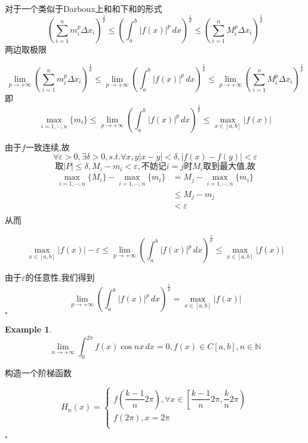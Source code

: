 \documentclass[11pt,hyperref,a4paper,UTF8]{ctexart}
\newtheorem{example}{Example}[subsection]
\newenvironment{cproof}{%
\heiti{证明}\kaishu
}{%
  \hfill $\square$
  \par\bigskip
}
\newcommand{\NN}{\mathbb{N}}
\newcommand{\parameter}[1]{\left(#1\right)}
\newcommand{\abs}[1]{\left|#1\right|}
\begin{document}
\begin{CJK}{UTF8}{gkai}
\begin{cproof}
  对于一个类似于Darboux上和和下和的形式
  \[\parameter{\sum_{i = 1}^{n} m_i^p \Delta x_i}^{\frac{1}{p}} \leq  \parameter{\int_{a}^{b} |f(x)|^p \, dx}^{\frac{1}{p}} \leq  \parameter{\sum_{i = 1}^{n} M_i^p \Delta x_i}^{\frac{1}{p}}\]
两边取极限

\[\lim_{p \to +\infty} \parameter{\sum_{i = 1}^{n} m_i^p \Delta x_i}^{\frac{1}{p}} \leq \lim_{p \to + \infty} \parameter{\int_{a}^{b} |f(x)|^p \, dx}^{\frac{1}{p}} \leq \lim_{p \to +\infty} \parameter{\sum_{i = 1}^{n} M_i^p \Delta x_i}^{\frac{1}{p}}\]
即
\[\max_{i = 1,\cdots ,n}\{m_i\} \leq \lim_{p \to + \infty} (\int_{a}^{b} |f(x)|^p \, dx)^{\frac{1}{p}} \leq \max_{x\in[a,b]}\abs{f(x)}\]

由于$f$一致连续,故
\[\forall \varepsilon> 0 ,\exists \delta >0, s.t.\forall x,y |x - y| < \delta , |f(x) - f(y)| < \varepsilon \]
\[\text{取}|P| \leq \delta ,M_i - m_i < \varepsilon ,\text{不妨记}i = j\text{时}M_i\text{取到最大值,故}\]
\[
\begin{aligned}\max_{i = 1,\cdots ,n}\{M_i\} - \max_{i = 1,\cdots ,n}\{m_i\} &= M_j - \max_{i = 1,\cdots ,n}\{m_i\}\\
  &\leq M_j - m_j\\
  &< \varepsilon\\
\end{aligned}  
\]
从而

\[\max_{x\in[a,b]}\abs{f(x)} - \varepsilon \leq \lim_{p \to + \infty} \parameter{\int_{a}^{b} |f(x)|^p \, dx}^{\frac{1}{p}} \leq \max_{x\in[a,b]}\abs{f(x)}\]

由于$\varepsilon$的任意性,我们得到
\[\lim_{p \to + \infty} \parameter{\int_{a}^{b} |f(x)|^p \, dx}^{\frac{1}{p}} = \max_{x\in[a,b]}\abs{f(x)}\]
\end{cproof}

\begin{example}
\[\lim_{n \to +\infty} \int_{0}^{2 \pi} f(x)\cos nx \, dx = 0, f(x) \in C[a,b],n\in \NN\]  
\end{example}


\begin{cproof}
构造一个阶梯函数

\begin{equation*}
  H_n(x) =
  \begin{cases}
    f(\dfrac{k -1}{n}  2\pi),\forall x \in \left[\dfrac{k -1}{n}  2\pi,\dfrac{k}{n} 2\pi\right)\\
    f(2 \pi) , x = 2 \pi\\
  \end{cases}
\end{equation*}


\end{cproof}
\end{CJK}
\end{document}
